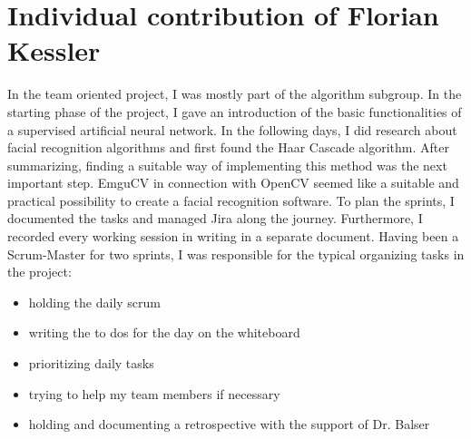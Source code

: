 \documentclass[12pt, a4paper]{article}
\begin{document}
\newpage



\section{Individual contribution of Florian Kessler}
In the team oriented project, I was mostly part of the algorithm subgroup. In the starting phase of the project, I gave an introduction of the basic functionalities of a supervised artificial neural network. In the following days, I did research about facial recognition algorithms and first found the Haar Cascade algorithm. After summarizing, finding a suitable way of implementing this method was the next important step. EmguCV in connection with OpenCV seemed like a suitable and practical possibility to create a facial recognition software. To plan the sprints, I documented the tasks and managed Jira along the journey. Furthermore, I recorded every working session in writing in a separate document. Having been a Scrum-Master for two sprints, I was responsible for the typical organizing tasks in the project:
\begin{itemize}
\item holding the daily scrum
\item writing the to dos for the day on the whiteboard
\item prioritizing daily tasks
\item trying to help my team members if necessary
\item holding and documenting a retrospective with the support of Dr. Balser
\end{itemize}
\end{document}
